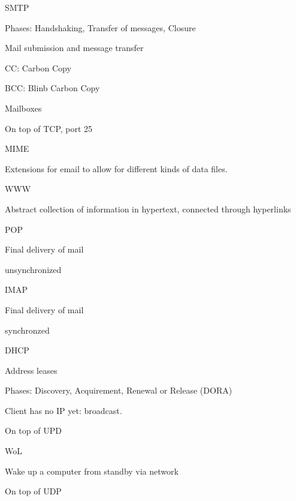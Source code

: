 \documentclass[main.tex]{subfiles}
\begin{document}
\begin{card}{SMTP}
\item Phases: Handshaking, Transfer  of  messages, Closure
\item Mail submission and message transfer
\item CC: Carbon Copy
\item BCC: Blinb Carbon Copy
\item Mailboxes
\item On top of TCP, port 25
\end{card}

\begin{card}{MIME}
\item Extensions for email to allow for different kinds of data files.
\end{card}

\begin{card}{WWW}
\item Abstract collection of information in hypertext, connected through hyperlinks
\end{card}

\begin{card}{POP}
\item Final delivery of mail
\item unsynchronized
\end{card}

\begin{card}{IMAP}
\item Final delivery of mail
\item synchronzed
\end{card}

\begin{card}{DHCP}
\item Address leases
\item Phases: Discovery, Acquirement, Renewal or Release (DORA)
\item Client has no IP yet: broadcast.
\item On top of UPD
\end{card}

\begin{card}{WoL}
\item Wake up a computer from standby via network
\item On top of UDP
\end{card}
\end{document}
